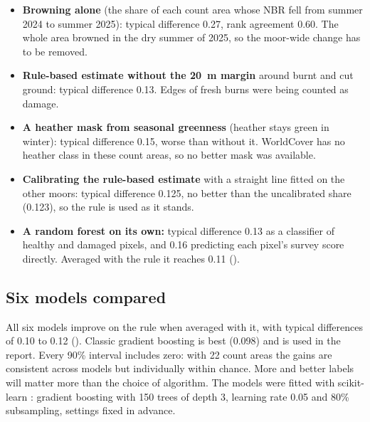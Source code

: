 \documentclass[11pt,a4paper]{article}
\begin{document}
\begin{itemize}
\item \textbf{Browning alone} (the share of each count area whose NBR fell from summer 2024 to summer 2025): typical difference 0.27, rank agreement 0.60. The whole area browned in the dry summer of 2025, so the moor-wide change has to be removed.
\item \textbf{Rule-based estimate without the 20~m margin} around burnt and cut ground: typical difference 0.13. Edges of fresh burns were being counted as damage.
\item \textbf{A heather mask from seasonal greenness} (heather stays green in winter): typical difference 0.15, worse than without it. WorldCover has no heather class in these count areas, so no better mask was available.
\item \textbf{Calibrating the rule-based estimate} with a straight line fitted on the other moors: typical difference 0.125, no better than the uncalibrated share (0.123), so the rule is used as it stands.
\item \textbf{A random forest on its own:} typical difference 0.13 as a classifier of healthy and damaged pixels, and 0.16 predicting each pixel's survey score directly. Averaged with the rule it reaches 0.11 ().
\end{itemize}

\subsection{Six models compared}\label{app:beetle-models}

\begin{table}[H]
\centering
\caption{Six models for Step 2, alone and averaged with the rule-based estimate. 22 count areas, leave-one-moor-out. The interval is the paired-bootstrap 90\% interval for the change in typical difference against the rule alone; negative is better.}\label{tab:models}
\scriptsize
\setlength{\tabcolsep}{3.5pt}

\end{table}

All six models improve on the rule when averaged with it, with typical differences of 0.10 to 0.12 (). Classic gradient boosting is best (0.098) and is used in the report. Every 90\% interval includes zero: with 22 count areas the gains are consistent across models but individually within chance. More and better labels will matter more than the choice of algorithm. The models were fitted with scikit-learn \citep{pedregosa2011}: gradient boosting with 150 trees of depth 3, learning rate 0.05 and 80\% subsampling, settings fixed in advance.
\end{document}
